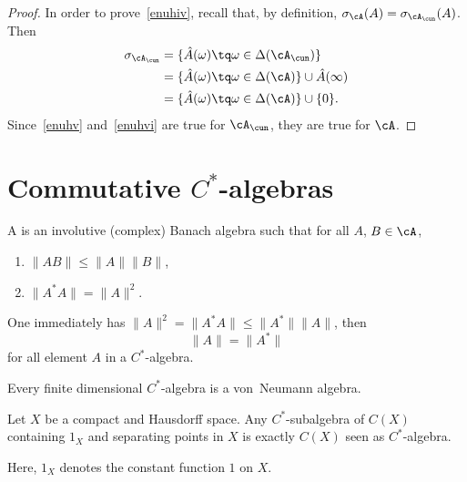 \begin{proof}
In order to prove~\ref{enuhiv}, recall that, by definition, $\sigma_{\cA}(A)=\sigma_{\cA_{\cun}}(A)$. Then
\begin{subequations}
    \begin{align}
  \sigma_{\cA_{\cun}}&=\{\hat A(\omega)\tq\omega\in\Delta(\cA_{\cun})\}\\
                     &=\{\hat A(\omega)\tq \omega\in\Delta(\cA)\}\cup\hat A(\infty)\\
                     &=\{\hat A(\omega)\tq \omega\in\Delta(\cA)\}\cup\{0\}.
    \end{align}
\end{subequations}
Since~\ref{enuhv} and~\ref{enuhvi} are true for $\cA_{\cun}$, they are true for $\cA$.

\end{proof}

\section{Commutative \texorpdfstring{$C^*$}{C}-algebras}

\begin{definition}
    A  is an involutive (complex) Banach algebra such that for all $A$, $B\in\cA$,
    \begin{enumerate}
        \item $\|AB\|\leq\|A\|\|B\|$,
        \item $\|A^*A\|=\|A\|^2$.
    \end{enumerate}
    One immediately has $\|A\|^2=\|A^*A\|\leq\|A^*\|\|A\|$, then
    \begin{equation}
        \|A\|=\|A^*\|
    \end{equation}
    for all element $A$ in a $C^*$-algebra.
\end{definition}

\begin{lemma}       \label{LemFiniCSestVNa}
    Every finite dimensional $C^*$-algebra is a von~Neumann algebra.
\end{lemma}

\begin{lemma}
Let $X$ be a compact and Hausdorff space. Any $C^*$-subalgebra of $C(X)$ containing $1_X$ and separating points in $X$ is exactly $C(X)$ seen as $C^*$-algebra.
\end{lemma}\label{lem:Stone_W}
Here, $1_X$ denotes the constant function $1$ on $X$.


